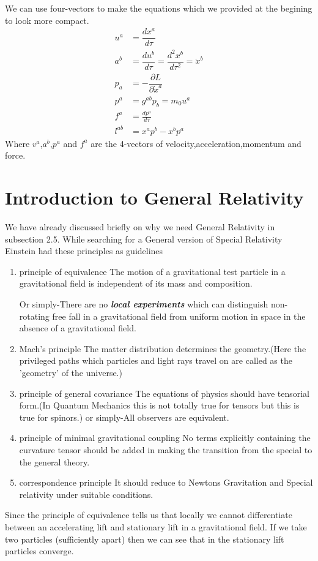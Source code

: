 \documentclass[12pt,a4paper]{article}
\numberwithin{table}{section}
\numberwithin{figure}{section}
\numberwithin{equation}{section}
\theoremstyle{remark}
\theoremstyle{definition}
\begin{document}
We can use four-vectors to make the equations which we provided at the begining to look more compact.
\begin{align}
u^a&=\dfrac{dx^a}{d\tau}\\
a^b&=\dfrac{du^b}{d\tau}=\dfrac{d^2x^b}{d\tau^2}=\ddot{x}^b\\
p_a&=-\dfrac{\partial L}{\partial \dot{x}^a}\\
p^a&=g^{ab}p_b=m_0u^a\\
f^a&=\frac{dp^a}{d\tau}\\
l^{ab}&=x^ap^b-x^bp^a
\end{align}
Where $v^a$,$a^b$,$p^a$ and $f^a$ are the 4-vectors of velocity,acceleration,momentum and force.

\section{Introduction to General Relativity}
We have already discussed briefly on why we need General Relativity in subsection 2.5. While searching for a General version of Special Relativity Einstein had these principles as guidelines
\begin{enumerate}
    \item principle of equivalence
    The motion of a gravitational test particle in a gravitational field is independent of its mass and composition.

Or simply-There are no \textbf{\textit{local experiments}} which can distinguish non-rotating 
free fall in a gravitational field from uniform motion in space in the 
absence of a gravitational field. 
    \item Mach's principle
    The matter distribution determines the geometry.(Here the privileged paths which particles and light rays travel on are called as the 'geometry' of the universe.)
    \item principle of general covariance
    The equations of physics should have 
tensorial form.(In Quantum Mechanics this is not totally true for tensors but this is true for spinors.)
or simply-All observers are equivalent.
    \item principle of minimal gravitational coupling
    No terms explicitly containing the curvature tensor should be added in making the transition from the special to the general theory. 
    \item correspondence principle
    It should reduce to Newtons Gravitation and Special relativity under suitable conditions.
\end{enumerate}
Since the principle of equivalence tells us that locally we cannot differentiate between an accelerating lift and stationary lift in a gravitational field. If we take two particles (sufficiently apart) then we can see that in the stationary  lift particles converge. 
\end{document}
